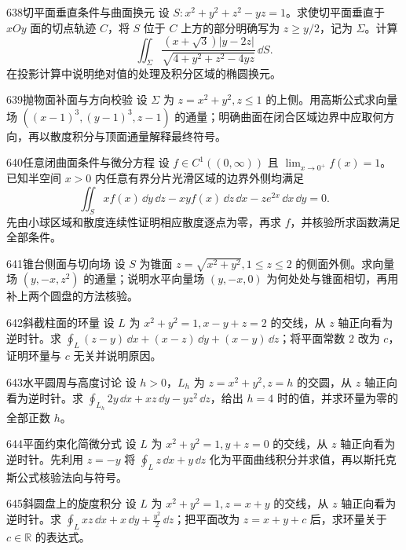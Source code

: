\begin{exercise}{638}{切平面垂直条件与曲面换元}
设 $S:x^2+y^2+z^2-yz=1$。求使切平面垂直于 $xOy$ 面的切点轨迹 $C$，将 $S$ 位于 $C$ 上方的部分明确写为 $z\ge y/2$，记为 $\Sigma$。计算
\[\iint_{\Sigma}\frac{(x+\sqrt3)|y-2z|}{\sqrt{4+y^2+z^2-4yz}}\,\dd S.\]
在投影计算中说明绝对值的处理及积分区域的椭圆换元。
\end{exercise}
\begin{exercise}{639}{抛物面补面与方向校验}
设 $\Sigma$ 为 $z=x^2+y^2,z\le1$ 的上侧。用高斯公式求向量场 $((x-1)^3,(y-1)^3,z-1)$ 的通量；明确曲面在闭合区域边界中应取何方向，再以散度积分与顶面通量解释最终符号。
\end{exercise}
\begin{exercise}{640}{任意闭曲面条件与微分方程}
设 $f\in C^1((0,\infty))$ 且 $\lim_{x\to0^+}f(x)=1$。已知半空间 $x>0$ 内任意有界分片光滑区域的边界外侧均满足
\[\iint_Sxf(x)\,\dd y\,\dd z-xyf(x)\,\dd z\,\dd x-ze^{2x}\,\dd x\,\dd y=0.\]
先由小球区域和散度连续性证明相应散度逐点为零，再求 $f$，并核验所求函数满足全部条件。
\end{exercise}
\begin{exercise}{641}{锥台侧面与切向场}
设 $S$ 为锥面 $z=\sqrt{x^2+y^2},1\le z\le2$ 的侧面外侧。求向量场 $(y,-x,z^2)$ 的通量；说明水平向量场 $(y,-x,0)$ 为何处处与锥面相切，再用补上两个圆盘的方法核验。
\end{exercise}
\begin{exercise}{642}{斜截柱面的环量}
设 $L$ 为 $x^2+y^2=1,x-y+z=2$ 的交线，从 $z$ 轴正向看为逆时针。求 $\oint_L(z-y)\,\dd x+(x-z)\,\dd y+(x-y)\,\dd z$；将平面常数 $2$ 改为 $c$，证明环量与 $c$ 无关并说明原因。
\end{exercise}
\begin{exercise}{643}{水平圆周与高度讨论}
设 $h>0$，$L_h$ 为 $z=x^2+y^2,z=h$ 的交圆，从 $z$ 轴正向看为逆时针。求 $\oint_{L_h}2y\,\dd x+xz\,\dd y-yz^2\,\dd z$，给出 $h=4$ 时的值，并求环量为零的全部正数 $h$。
\end{exercise}
\begin{exercise}{644}{平面约束化简微分式}
设 $L$ 为 $x^2+y^2=1,y+z=0$ 的交线，从 $z$ 轴正向看为逆时针。先利用 $z=-y$ 将 $\oint_Lz\,\dd x+y\,\dd z$ 化为平面曲线积分并求值，再以斯托克斯公式核验法向与符号。
\end{exercise}
\begin{exercise}{645}{斜圆盘上的旋度积分}
设 $L$ 为 $x^2+y^2=1,z=x+y$ 的交线，从 $z$ 轴正向看为逆时针。求 $\oint_Lxz\,\dd x+x\,\dd y+\frac{y^2}2\,\dd z$；把平面改为 $z=x+y+c$ 后，求环量关于 $c\in\mathbb R$ 的表达式。
\end{exercise}
